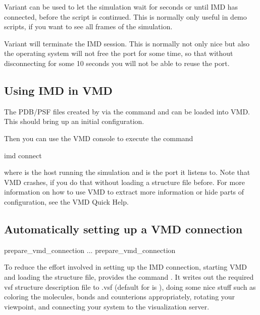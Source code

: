 Variant  can be used to let the simulation wait for
 seconds or until IMD has connected, before the script is
continued. This is normally only useful in demo scripts, if you want
to see all frames of the simulation.

Variant  will terminate the IMD session. This is normally
not only nice but also the operating system will not free the port for
some time, so that without disconnecting for some 10 seconds you will
not be able to reuse the port.

\subsection{Using IMD in VMD}

The PDB/PSF files created by \es via the command  and
 can be loaded into VMD. This should bring up an initial
configuration.

Then you can use the VMD console to execute the command
\begin{code}
  imd connect  
\end{code}
where  is the host running the simulation and  is
the port it listens to. Note that VMD crashes, if you do that without
loading a structure file before.  For more information on how to use
VMD to extract more information or hide parts of configuration, see
the VMD Quick Help.

\subsection{Automatically setting up a VMD connection}

\begin{essyntax}
 prepare_vmd_connection 
   
...
 prepare_vmd_connection 
\end{essyntax}

To reduce the effort involved in setting up the IMD connection,
starting VMD and loading the structure file, \es provides the command
.  It writes out the required
vsf structure description file to .vsf (default
for  is ), doing some nice stuff such as
coloring the molecules, bonds and counterions appropriately, rotating
your viewpoint, and connecting your system to the visualization
server.


